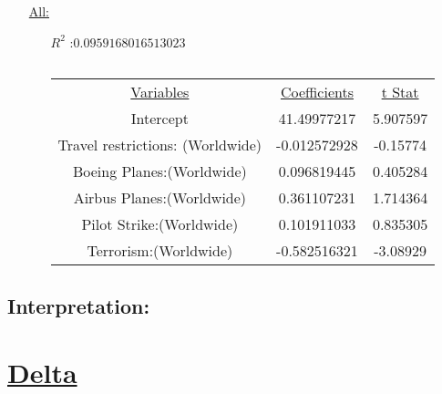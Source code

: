 \documentclass[12pt]{report}
\begin{document}
\begin{enumerate}
\begin{enumerate}
    \end{enumerate}
    \item[\underline{All:}]
 \begin{samepage}

    \begin{enumerate}
        \item[$R^2$]:$0.0959168016513023$
        \item[]


            \item[$$]\begin{tabular}{|c|c|c|}
                    \toprule
                    \hline
                    \underline{Variables} & \underline{Coefficients} & \underline{t Stat}\\
                    Intercept & 41.49977217 & 5.907597 \\ \hline
                    Travel restrictions: (Worldwide) & -0.012572928 & -0.15774 \\ \hline
                Boeing Planes:(Worldwide) & 0.096819445 & 0.405284 \\ \hline
                Airbus Planes:(Worldwide) & 0.361107231 & 1.714364 \\ \hline
                Pilot Strike:(Worldwide) & 0.101911033 & 0.835305 \\ \hline
                Terrorism:(Worldwide) & -0.582516321 & -3.08929 \\ \hline
                \bottomrule
            \end{tabular}




    \end{enumerate}
\end{samepage}
\end{enumerate}
\subsection*{Interpretation:}

\newpage
\section*{\underline{Delta}}
\end{document}
